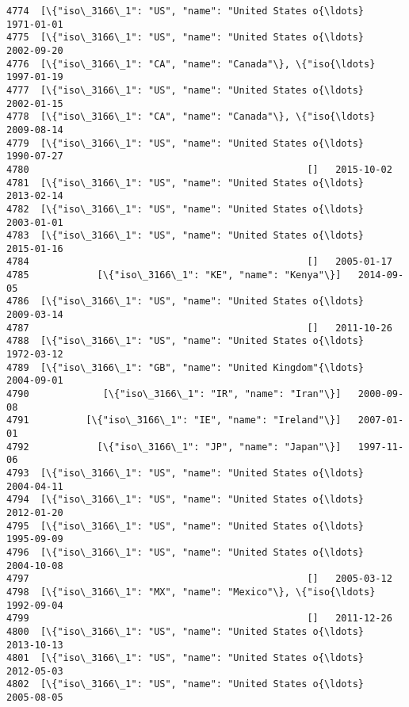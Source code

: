 \documentclass[11pt]{article}
\begin{document}
\begin{Verbatim}[commandchars=\\\{\}]
4774  [\{"iso\_3166\_1": "US", "name": "United States o{\ldots}   1971-01-01   
4775  [\{"iso\_3166\_1": "US", "name": "United States o{\ldots}   2002-09-20   
4776  [\{"iso\_3166\_1": "CA", "name": "Canada"\}, \{"iso{\ldots}   1997-01-19   
4777  [\{"iso\_3166\_1": "US", "name": "United States o{\ldots}   2002-01-15   
4778  [\{"iso\_3166\_1": "CA", "name": "Canada"\}, \{"iso{\ldots}   2009-08-14   
4779  [\{"iso\_3166\_1": "US", "name": "United States o{\ldots}   1990-07-27   
4780                                                 []   2015-10-02   
4781  [\{"iso\_3166\_1": "US", "name": "United States o{\ldots}   2013-02-14   
4782  [\{"iso\_3166\_1": "US", "name": "United States o{\ldots}   2003-01-01   
4783  [\{"iso\_3166\_1": "US", "name": "United States o{\ldots}   2015-01-16   
4784                                                 []   2005-01-17   
4785            [\{"iso\_3166\_1": "KE", "name": "Kenya"\}]   2014-09-05   
4786  [\{"iso\_3166\_1": "US", "name": "United States o{\ldots}   2009-03-14   
4787                                                 []   2011-10-26   
4788  [\{"iso\_3166\_1": "US", "name": "United States o{\ldots}   1972-03-12   
4789  [\{"iso\_3166\_1": "GB", "name": "United Kingdom"{\ldots}   2004-09-01   
4790             [\{"iso\_3166\_1": "IR", "name": "Iran"\}]   2000-09-08   
4791          [\{"iso\_3166\_1": "IE", "name": "Ireland"\}]   2007-01-01   
4792            [\{"iso\_3166\_1": "JP", "name": "Japan"\}]   1997-11-06   
4793  [\{"iso\_3166\_1": "US", "name": "United States o{\ldots}   2004-04-11   
4794  [\{"iso\_3166\_1": "US", "name": "United States o{\ldots}   2012-01-20   
4795  [\{"iso\_3166\_1": "US", "name": "United States o{\ldots}   1995-09-09   
4796  [\{"iso\_3166\_1": "US", "name": "United States o{\ldots}   2004-10-08   
4797                                                 []   2005-03-12   
4798  [\{"iso\_3166\_1": "MX", "name": "Mexico"\}, \{"iso{\ldots}   1992-09-04   
4799                                                 []   2011-12-26   
4800  [\{"iso\_3166\_1": "US", "name": "United States o{\ldots}   2013-10-13   
4801  [\{"iso\_3166\_1": "US", "name": "United States o{\ldots}   2012-05-03   
4802  [\{"iso\_3166\_1": "US", "name": "United States o{\ldots}   2005-08-05   


\end{Verbatim}
\end{document}
